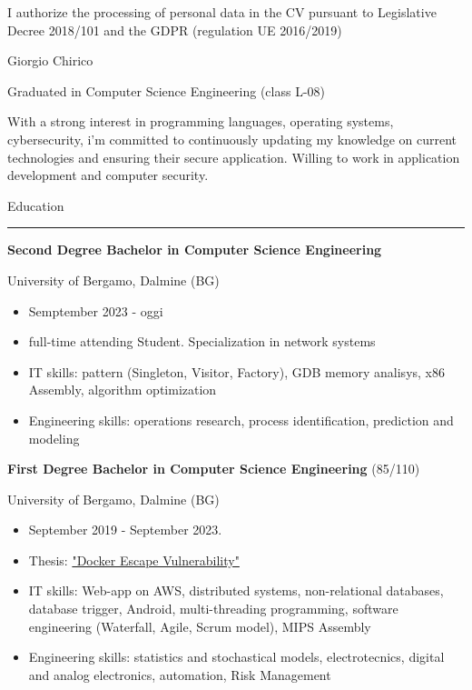 \documentclass[a4paper]{letter}
\begin{document}
\hfill
\begin{minipage}[t]{0.65\textwidth}
\setlength{\baselineskip}{1.4\baselineskip}

{\tiny I authorize the processing of personal data in the CV pursuant to Legislative Decree 2018/101 and the GDPR (regulation UE 2016/2019)}
\vspace{0.3cm}


{\huge Giorgio Chirico}

{\large Graduated in Computer Science Engineering (class L-08)}

\vspace{0.5cm}
 
With a strong interest in programming languages, operating systems, cybersecurity, i'm committed to continuously updating my knowledge on current technologies and ensuring their secure application. Willing to work in application development and computer security. 


\vspace{0.5cm}

{\large Education}
\rule{\linewidth}{0.4pt}

{\large \textbf{Second Degree Bachelor in Computer Science Engineering}}

{\small University of Bergamo, Dalmine (BG)}
\begin{itemize}
    \item Semptember 2023 - oggi
    \item full-time attending Student. Specialization in network systems
    \item IT skills: pattern (Singleton, Visitor, Factory), GDB memory analisys, x86 Assembly, algorithm optimization
    \item Engineering skills: operations research, process identification, prediction and modeling 
\end{itemize}

{\large \textbf{First Degree Bachelor in Computer Science Engineering} \small (85/110)}

{\small University of Bergamo, Dalmine (BG)}
\begin{itemize}
    \item September 2019 - September 2023.
    \item Thesis: \href{https://github.com/giorgio-hash/tesi-triennio}{"Docker Escape Vulnerability"}
    \item IT skills: Web-app on AWS, distributed systems, non-relational databases, database trigger, Android, multi-threading programming, software engineering (Waterfall, Agile, Scrum model), MIPS Assembly
    \item Engineering skills: statistics and stochastical models, electrotecnics, digital and analog electronics, automation, Risk Management
\end{itemize}


\end{minipage}
\end{document}
